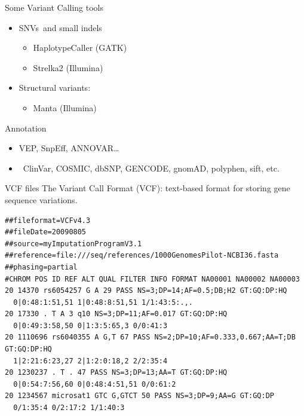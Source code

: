 \documentclass[usepdftitle=false]{beamer}
\begin{document}
\begin{frame}{Some Variant Calling tools}
	\begin{itemize}
		\item SNVs\footnotemark\ and small indels\footnotemark
		\pause
	\begin{itemize}
			\item HaplotypeCaller (GATK)
			\item Strelka2 (Illumina)
		\end{itemize}
		\pause
		\item Structural variants:
		\pause
		\begin{itemize}
			\item Manta (Illumina)
		\end{itemize}
	\end{itemize}
\end{frame}

\begin{frame}{Annotation}
	\begin{itemize}
		\item VEP, SnpEff, ANNOVAR\dots
		\item \faDatabase\ ClinVar, COSMIC, dbSNP, GENCODE, gnomAD, polyphen, sift, etc.
	\end{itemize}
\end{frame}

\begin{frame}[fragile]{VCF files}
	The Variant Call Format (VCF): text-based format for storing gene sequence variations.
	\pause

	\begin{verbatim}
##fileformat=VCFv4.3
##fileDate=20090805
##source=myImputationProgramV3.1
##reference=file:///seq/references/1000GenomesPilot-NCBI36.fasta
##phasing=partial
#CHROM POS ID REF ALT QUAL FILTER INFO FORMAT NA00001 NA00002 NA00003
20 14370 rs6054257 G A 29 PASS NS=3;DP=14;AF=0.5;DB;H2 GT:GQ:DP:HQ
  0|0:48:1:51,51 1|0:48:8:51,51 1/1:43:5:.,.
20 17330 . T A 3 q10 NS=3;DP=11;AF=0.017 GT:GQ:DP:HQ
  0|0:49:3:58,50 0|1:3:5:65,3 0/0:41:3
20 1110696 rs6040355 A G,T 67 PASS NS=2;DP=10;AF=0.333,0.667;AA=T;DB GT:GQ:DP:HQ
  1|2:21:6:23,27 2|1:2:0:18,2 2/2:35:4
20 1230237 . T . 47 PASS NS=3;DP=13;AA=T GT:GQ:DP:HQ
  0|0:54:7:56,60 0|0:48:4:51,51 0/0:61:2
20 1234567 microsat1 GTC G,GTCT 50 PASS NS=3;DP=9;AA=G GT:GQ:DP
  0/1:35:4 0/2:17:2 1/1:40:3
	\end{verbatim}
\end{frame}
\end{document}
